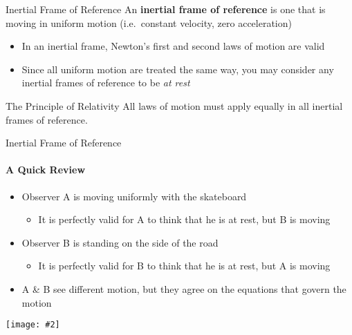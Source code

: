 \documentclass[12pt,compress,aspectratio=169]{beamer}
\newcommand{\pic}[2]{\texttt{[image: \#2]}}
\begin{document}
\begin{frame}{Inertial Frame of Reference}
  An \textbf{inertial frame of reference} is one that is moving in uniform
  motion (i.e.\ constant velocity, zero acceleration)
  \begin{itemize}
  \item In an inertial frame, Newton's first and second laws of motion are valid
  \item Since all uniform motion are treated the same way, you may consider
    any inertial frames of reference to be \emph{at rest}
  \end{itemize}
  \vspace{.2in}
  \begin{block}{The Principle of Relativity}
    All laws of motion must apply equally in all inertial frames of reference.
  \end{block}
\end{frame}


\begin{frame}{Inertial Frame of Reference}
  \framesubtitle{A Quick Review}
  \begin{itemize}
  \item Observer A is moving uniformly with the skateboard
    \begin{itemize}
    \item It is perfectly valid for A to think that he is at rest, but B is
      moving
    \end{itemize}
  \item Observer B is standing on the side of the road
    \begin{itemize}
    \item It is perfectly valid for B to think that he is at rest, but A is
      moving
    \end{itemize}
  \item A \& B see different motion, but they agree on the equations
    that govern the motion
  \end{itemize}
  \begin{center}
    \vspace{-.1in}
    \pic{.65}{graphics/57.jpg}
  \end{center}
\end{frame}
\end{document}

